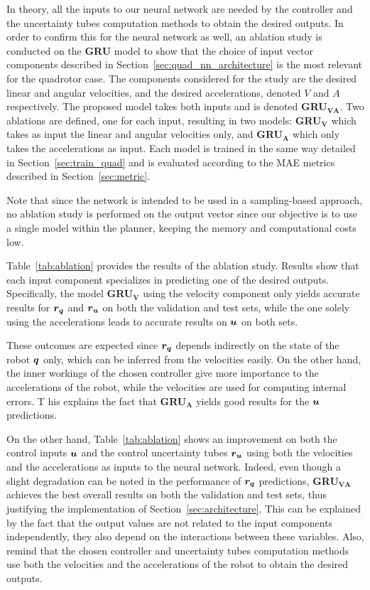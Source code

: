 

In theory, all the inputs to our neural network are needed by the controller and the uncertainty tubes computation methods to obtain the desired outputs. 
In order to confirm this for the neural network as well, an ablation study is conducted on the \textbf{GRU} model to show that the choice of input vector components described in Section~\ref{sec:quad_nn_architecture} is the most relevant for the quadrotor case. 
The components considered for the study are the desired linear and angular velocities, and the desired accelerations, denoted $V$ and $A$ respectively. 
The proposed model takes both inputs and is denoted \textbf{GRU$\boldsymbol{_{VA}}$}. 
Two ablations are defined, one for each input, resulting in two models: \textbf{GRU$\boldsymbol{_V}$} which takes as input the linear and angular velocities only, and \textbf{GRU$\boldsymbol{_A}$} which only takes the accelerations as input. 
Each model is trained in the same way detailed in Section~\ref{sec:train_quad} and is evaluated according to the MAE metrics described in Section~\ref{sec:metric}.

Note that since the network is intended to be used in a sampling-based approach, no ablation study is performed on the output vector since our objective is to use a single model within the planner, keeping the memory and computational costs low.

Table~\ref{tab:ablation} provides the results of the ablation study.
Results show that each input component specializes in predicting one of the desired outputs.
Specifically, the model \textbf{GRU$\boldsymbol{_V}$} using the velocity component only yields accurate results for $\boldsymbol{r_q}$ and $\boldsymbol{r_u}$ on both the validation and test sets, while the one solely using the accelerations leads to accurate results on $\boldsymbol{u}$ on both sets.

These outcomes are expected since $\boldsymbol{r_q}$ depends indirectly on the state of the robot $\boldsymbol{q}$ only, which can be inferred from the velocities easily. 
On the other hand, the inner workings of the chosen controller give more importance to the accelerations of the robot, while the velocities are used for computing internal errors. T
his explains the fact that \textbf{GRU$\boldsymbol{_A}$} yields good results for the $\boldsymbol{u}$ predictions.

On the other hand, Table~\ref{tab:ablation} shows an improvement on both the control inputs $\boldsymbol{u}$ and the control uncertainty tubes $\boldsymbol{r_u}$ using both the velocities and the accelerations as inputs to the neural network. 
Indeed, even though a slight degradation can be noted in the performance of $\boldsymbol{r_q}$ predictions, \textbf{GRU$\boldsymbol{_{VA}}$} achieves the best overall results on both the validation and test sets, thus justifying the implementation of Section~\ref{sec:architecture}. 
This can be explained by the fact that the output values are not related to the input components independently, they also depend on the interactions between these variables. 
Also, remind that the chosen controller and uncertainty tubes computation methods use both the velocities and the accelerations of the robot to obtain the desired outputs.

